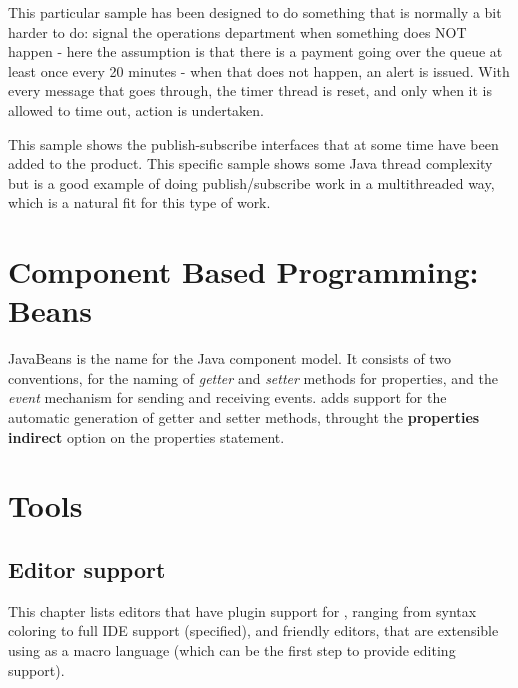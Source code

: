 This particular sample has been designed to do something that is
normally a bit harder
to do: signal the operations department when something does NOT happen
- here the assumption is that there is a payment going over the queue
at least once every 20 minutes - when that does not happen, an alert
is issued. With every message that goes through, the timer thread is
reset, and only when it is allowed to time out, action is undertaken.


This sample shows the publish-subscribe interfaces that at some time have been
added to the product. This specific sample shows some Java thread
complexity but is a good example of doing publish/subscribe work in a
multithreaded way, which is a natural fit for this type of work.



\chapter{Component Based Programming: Beans}
JavaBeans is the name for the Java component model. It consists of two
conventions, for the naming of \emph{getter} and \emph{setter} methods
for properties, and the \emph{event} mechanism for sending and
receiving events. \nr{}adds support for the automatic generation of
getter and setter methods, throught the \textbf{properties indirect}
option on the properties statement.



\chapter{\nr{}Tools}
\section{Editor support}\label{editors}
This chapter lists editors that have plugin support for \nr{},
ranging from syntax coloring to full IDE support (specified), and
\Rexx{} friendly editors, that are extensible using \Rexx{} as a macro
language (which can be the first step to provide \nr{} editing support).
